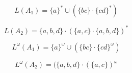 \[L(A_1)=\{a\}^* \cup (\{bc\}\cdot \{cd\}^*)\]

\[ L(A_2)=\{a, b, d\} \cdot (\{a, c\} \cdot \{ a, b, d\})^*\]

\[L^\omega(A_1)=\{a\}^\omega \cup (\{bc\}\cdot \{cd\}^\omega )\]

\[ L^\omega(A_2)=(\{a, b, d\} \cdot (\{a, c\}) ^\omega \]
